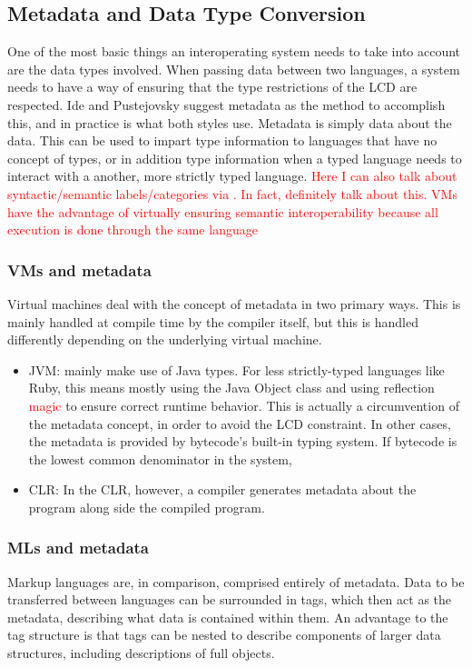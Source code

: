 \documentclass{sig-alternate}
\newcommand{\mycomment}[1]{\textcolor{red}{#1}}
\begin{document}
\subsection{Metadata and Data Type Conversion} \cite{Ide:2010, Bromberg:2011, Hamilton:2003}
One of the most basic things an interoperating system needs to take into account are the data types involved. 
When passing data between two languages, a system needs to have a way of ensuring that the type restrictions of the LCD are respected. Ide and Pustejovsky \cite{Ide:2010} suggest metadata as the method to accomplish this, and in practice is what both styles use. Metadata is simply data about the data. This can be used to impart type information to languages that have no concept of types, or in addition type information when a typed language needs to interact with a another, more strictly typed language.
\mycomment{Here I can also talk about syntactic/semantic labels/categories via \cite{Ide:2010}. In fact, definitely talk about this. VMs have the advantage of virtually ensuring semantic interoperability because all execution is done through the same language}
\subsubsection*{VMs and metadata}
Virtual machines deal with the concept of metadata in two primary ways. This is mainly handled at compile time by the compiler itself, but this is handled differently depending on the underlying virtual machine.
\begin{itemize}
\item JVM: mainly make use of Java types. For less strictly-typed languages like Ruby, this means mostly using the Java Object class and using reflection \mycomment{magic} to ensure correct runtime behavior. This is actually a circumvention of the metadata concept, in order to avoid the LCD constraint. In other cases, the metadata is provided by bytecode's built-in typing system. If bytecode is the lowest common denominator in the system, 
\item CLR: In the CLR, however, a compiler generates metadata about the program along side the compiled program\cite{Hamilton:2003}.
\end{itemize}

\subsubsection*{MLs and metadata}
Markup languages are, in comparison, comprised entirely of metadata. Data to be transferred between languages can be surrounded in tags, which then act as the metadata, describing what data is contained within them. An advantage to the tag structure is that tags can be nested to describe components of larger data structures, including descriptions of full objects. 
\end{document}
